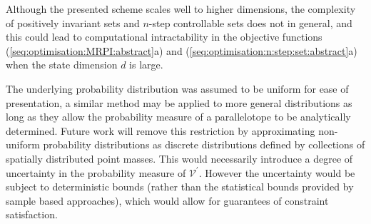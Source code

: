 \documentclass{ifacconf}
\providecommand{\V}{\mathcal V}
\begin{document}
Although the presented scheme scales well to higher dimensions, the complexity of positively invariant sets and $n$-step controllable sets does not in general, and this could lead to computational intractability in the objective functions (\ref{seq:optimisation:MRPI:abstract}a) and (\ref{seq:optimisation:n:step:set:abstract}a) when the state dimension $d$ is large.
%

The underlying probability distribution was assumed to be uniform for ease of presentation, a similar method may be applied to more general distributions as long as they allow the probability measure of a parallelotope to be analytically determined.
%
Future work will remove this restriction by approximating non-uniform probability distributions as discrete distributions defined by collections of spatially distributed point masses.
%
This would necessarily introduce a degree of uncertainty in the probability measure of $\V^\prime$. However the uncertainty would be subject to deterministic bounds (rather than the statistical bounds provided by sample based approaches), which would allow for guarantees of constraint satisfaction. 



%

\end{document}
